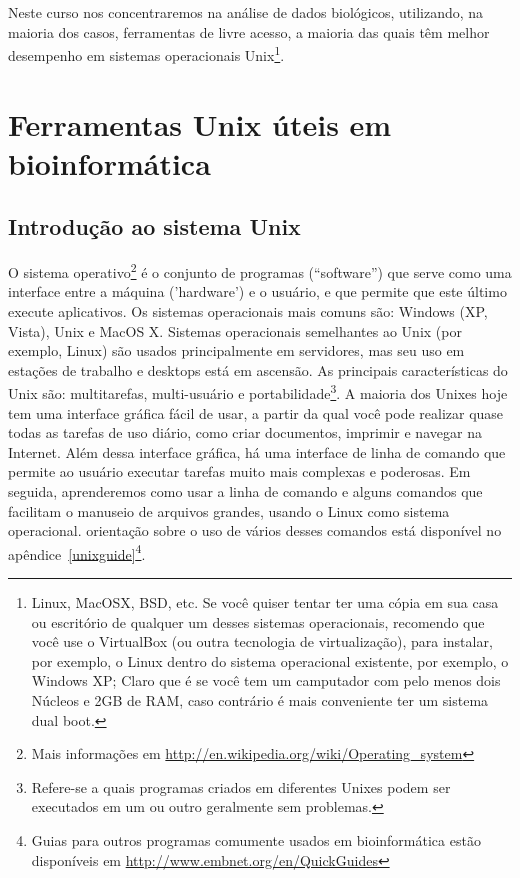 \documentclass[letter,11pt]{book}
\begin{document}
Neste curso nos concentraremos na análise de dados biológicos, utilizando, na maioria dos casos, ferramentas de livre acesso, a maioria das quais têm melhor desempenho em sistemas operacionais Unix\footnote{Linux, MacOSX, BSD, etc. Se você quiser tentar ter uma cópia em sua casa ou escritório de qualquer um desses sistemas operacionais, recomendo que você use o VirtualBox (ou outra tecnologia de virtualização), para instalar, por exemplo, o Linux dentro do sistema operacional existente, por exemplo, o Windows XP; Claro que é se você tem um camputador com pelo menos dois Núcleos e 2GB de RAM, caso contrário é mais conveniente ter um sistema dual boot.}.

\chapter{Ferramentas Unix úteis em bioinformática}
\section{Introdução ao sistema Unix}

O sistema operativo\footnote{Mais informações em \url{http://en.wikipedia.org/wiki/Operating_system}} é o conjunto de programas (``software'') que serve como uma interface entre a máquina ('hardware') e o usuário, e que permite que este último execute aplicativos. Os sistemas operacionais mais comuns são: Windows (XP, Vista), Unix e MacOS X. Sistemas operacionais semelhantes ao Unix (por exemplo, Linux) são usados principalmente em servidores, mas seu uso em estações de trabalho e desktops está em ascensão.  As principais características do Unix são: multitarefas, multi-usuário e portabilidade\footnote{Refere-se a quais programas criados em diferentes Unixes podem ser executados em um ou outro geralmente sem problemas.}. A maioria dos Unixes hoje tem uma interface gráfica fácil de usar, a partir da qual você pode realizar quase todas as tarefas de uso diário, como criar documentos, imprimir e navegar na Internet. Além dessa interface gráfica, há uma interface de linha de comando que permite ao usuário executar tarefas muito mais complexas e poderosas. Em seguida, aprenderemos como usar a linha de comando e alguns comandos que facilitam o manuseio de arquivos grandes, usando o Linux como sistema operacional. orientação sobre o uso de vários desses comandos está disponível no apêndice~\ref{unixguide}\footnote{Guias para outros programas comumente usados em bioinformática estão disponíveis em \url{http://www.embnet.org/en/QuickGuides}}.
\end{document}
